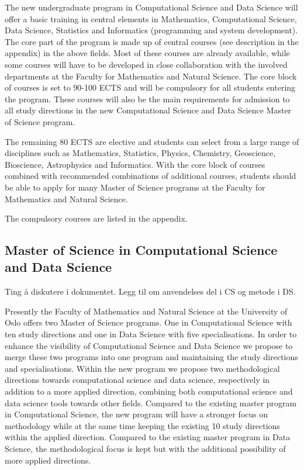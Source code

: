 \documentclass[oneside,final,10pt]{article}
\begin{document}
The new undergraduate program in Computational Science and Data Science will offer a basic training in central elements in Mathematics, Computational Science, Data Science, Statistics and Informatics (programming and system development). 
The core part of the program is made up of central courses (see description in the appendix) in the above fields. Most of these courses are already available, while some courses will have to be developed in close collaboration with the involved departments at the Faculty for Mathematics and Natural Science.
The core block of courses is set to 90-100 ECTS and will be compulsory for all students entering the program. These courses will also be the main requirements for admission to
 all study directions in the new Computational Science and Data Science Master of Science program.


The remaining 80 ECTS are elective and students can select from a large range of disciplines such as Mathematics, Statistics, Physics, Chemistry, Geoscience, Bioscience, Astrophysics and Informatics. 
With the core block of courses combined with recommended combinations of additional courses,  students should be able to apply for many Master of Science programs at the Faculty for Mathematics and Natural Science. 

The compulsory courses are listed in the appendix.

\subsection*{Master of Science in Computational Science and Data Science}

Ting å diskutere i dokumentet.
Legg til om anvendelses del i CS og metode i DS.

Presently the Faculty of Mathematics and Natural Science at the University of Oslo offers two Master of Science programs. One in Computational Science with ten study directions and one in Data Science with five specialisations. In order to enhance the visibility of Computational Science and Data Science we propose to merge these two programs into one program and maintaining the study directions and specialisations. Within the new program we propose two methodological directions towards computational science and data science, respectively in addition to a more applied direction, combining both computational science and data science tools towards other fields. Compared to the existing master program in Computational Science, the new program will have a stronger focus on methodology while at the same time keeping the existing 10 study directions within the applied direction. Compared to the existing master program in Data Science, the methodological focus is kept but with the additional possibility of more applied directions.
\end{document}

